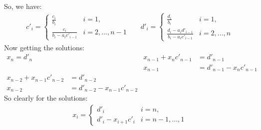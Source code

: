 \documentclass[12pt]{article}
\begin{document}
      So, we have:
      \begin{align*}
        c'_i =
        \begin{cases}
          \frac{c_i}{b_i} & i = 1, \\
          \frac{c_i}{b_i - a_ic'_{i-1}} & i = 2,...,n-1
        \end{cases} & & 
        d'_i = 
        \begin{cases}
          \frac{d_i}{b_i} & i=1, \\
          \frac{d_i - a_id'_{i-1}}{b_i - a_ic'_{i-1}} & i = 2,...,n
        \end{cases}
      \end{align*}
      Now getting the solutions:
      \begin{align*}
        x_n = d'_n & & 
        x_{n-1} + x_{n}c'_{n-1} &= d'_{n-1} \\
        & & x_{n-1} &= d'_{n-1} - x_{n}c'_{n-1} \\
        x_{n-2} + x_{n-1}c'_{n-2} &= d'_{n-2} \\
        x_{n-2} &=  d'_{n-2} - x_{n-1}c'_{n-2}
      \end{align*}
      So clearly for the solutions:
      \begin{align*}
        x_i = 
        \begin{cases}
          d'_i & i = n, \\
          d'_i - x_{i+1}c'_{i} & i = n-1,...,1
        \end{cases}
      \end{align*}
    \clearpage
  
\end{document}
